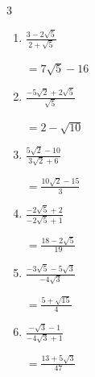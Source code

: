 \begin{multicols}{3}
\begin{enumerate}
        $\displaystyle =\frac{17+15\sqrt{2}}{23}$

  \item $\displaystyle \frac{3-2\sqrt{5}}{2+\sqrt{5}}$

        $\displaystyle =7\sqrt{5}-16$

\columnbreak %

  \item $\displaystyle \frac{-5\sqrt{2}+2\sqrt{5}}{\sqrt{5}}$

        $\displaystyle =2-\sqrt{10}$

  \item $\displaystyle \frac{5\sqrt{2}-10}{3\sqrt{2}+6}$

        $\displaystyle =\frac{10\sqrt{2}-15}{3}$

  \item $\displaystyle \frac{-2\sqrt{5}+2}{-2\sqrt{5}+1}$

        $\displaystyle =\frac{18-2\sqrt{5}}{19}$

  \item $\displaystyle \frac{-3\sqrt{5}-5\sqrt{3}}{-4\sqrt{3}}$

        $\displaystyle =\frac{5+\sqrt{15}}{4}$

  \item $\displaystyle \frac{-\sqrt{3}-1}{-4\sqrt{3}+1}$

        $\displaystyle =\frac{13+5\sqrt{3}}{47}$

\end{enumerate}
\end{multicols}
